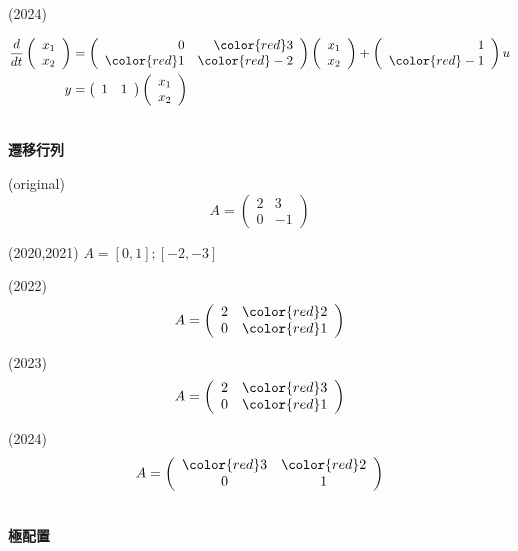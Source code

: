 (2024)

\def\chrA{\left(\begin{array}{rr} 0 &  \color{red} 3\\  \color{red} 1 &  \color{red} -2 \end{array}\right)}
\def\chrB{\left(\begin{array}{r} 1\\  \color{red} -1 \end{array}\right)}
\def\chrC{\left(\begin{array}{rr} 1 & 1 \end{array}\right)}
\def\statev{
	\left (
	\begin{array}{c}
	 x_1 \\ x_2 
	\end{array}
	\right )
}

\begin{align*}
	\frac{d}{dt} \statev 
	&= \chrA \statev + \chrB u
\\
	y 
	&= \chrC \statev
\end{align*}

\ \\ \noindent
{\bf 遷移行列}

(original)
\[
	A= \left(\begin{array}{cc}
		2 & 3 \\
		0 & -1
	   \end{array} \right )
\]

(2020,2021) $A=[0,1];[-2,-3]$

(2022)
\[
	A= \left(\begin{array}{cc}
		2 & \color{red} 2 \\
		0 & \color{red} 1
	   \end{array} \right )
\]



(2023)
\[
	A= \left(\begin{array}{cc}
		2 & \color{red} 3 \\
		0 & \color{red} 1
	   \end{array} \right )
\]

(2024)
\[
    A= \left(\begin{array}{cc} \color{red}3 & \color{red}2\\ 0 & 1 \end{array}\right)
\]

\ \\ \noindent
{\bf 極配置}

